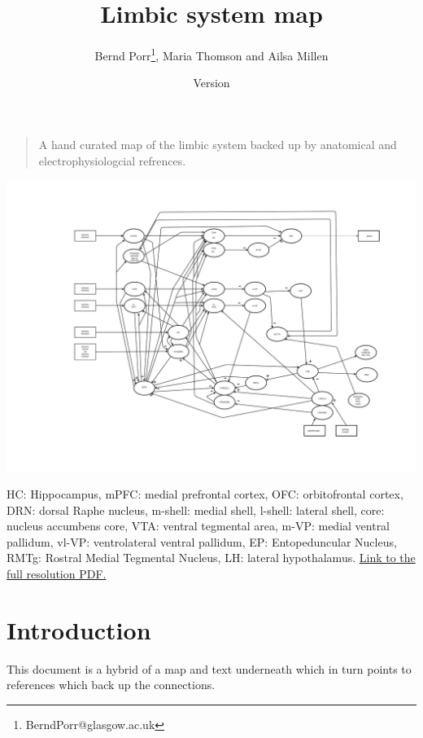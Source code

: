 \documentclass[12pt,a4paper]{article}
\title{Limbic system map}
\author{Bernd Porr\footnote{BerndPorr@glasgow.ac.uk}, Maria Thomson and Ailsa Millen}
\date{Version }
\begin{document}
\maketitle

\begin{quote}
  A hand curated map of the limbic system backed up by anatomical and electrophysiologcial
  refrences.
\end{quote}

\begin{latexonly}
  \begin{center}
    \includegraphics[width=\textwidth]{limbic-map}
  \end{center}
      {\footnotesize
        HC: Hippocampus, mPFC: medial prefrontal
        cortex, OFC: orbitofrontal cortex, DRN: dorsal Raphe nucleus, m-shell: medial shell,
        l-shell: lateral shell, core: nucleus accumbens core, VTA: ventral tegmental
        area, m-VP: medial ventral pallidum, vl-VP: ventrolateral ventral pallidum,
        EP: Entopeduncular Nucleus, RMTg: Rostral Medial Tegmental Nucleus,
        LH: lateral hypothalamus. \href{https://github.com/berndporr/limbic-system/blob/master/limbic-map.pdf}{Link to the full resolution PDF.}
      }
\end{latexonly}



\tableofcontents

\section{Introduction}
This document is a hybrid of a map and text
underneath which in turn points to references which back up the
connections.
\end{document}
